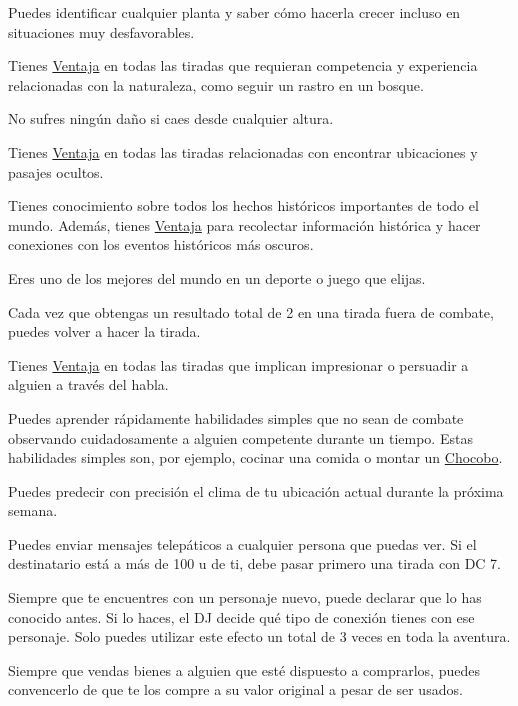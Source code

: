 \begin{description}[leftmargin=*]
{
	Puedes identificar cualquier planta y saber cómo hacerla crecer incluso en situaciones muy desfavorables.
}

{
	Tienes \hyperlink{check}{Ventaja} en todas las tiradas que requieran competencia y experiencia relacionadas con la naturaleza, como seguir un rastro en un bosque. 
}

{
	No sufres ningún daño si caes desde cualquier altura.
}

{
	Tienes \hyperlink{check}{Ventaja} en todas las tiradas relacionadas con encontrar ubicaciones y pasajes ocultos. 
}

{
	Tienes conocimiento sobre todos los hechos históricos importantes de todo el mundo. Además, tienes \hyperlink{check}{Ventaja} para recolectar información histórica y hacer conexiones con los eventos históricos más oscuros. 
}

{
	Eres uno de los mejores del mundo en un deporte o juego que elijas.
}

{
	Cada vez que obtengas un resultado total de 2 en una tirada fuera de combate, puedes volver a hacer la tirada.
}

{
	Tienes \hyperlink{check}{Ventaja} en todas las tiradas que implican impresionar o persuadir a alguien a través del habla. 
}

{
 Puedes aprender rápidamente habilidades simples que no sean de combate observando cuidadosamente a alguien competente durante un tiempo. Estas habilidades simples son, por ejemplo, cocinar una comida o montar un \hyperlink{chocobo}{Chocobo}.
}

\pagebreak

{
	Puedes predecir con precisión el clima de tu ubicación actual durante la próxima semana.
}

{
	Puedes enviar mensajes telepáticos a cualquier persona que puedas ver. Si el destinatario está a más de 100 u de ti, debe pasar primero una tirada con DC 7.
}

{
	Siempre que te encuentres con un personaje nuevo, puede declarar que lo has conocido antes. Si lo haces, el DJ decide qué tipo de conexión tienes con ese personaje. Solo puedes utilizar este efecto un total de 3 veces en toda la aventura.
}

{
	Siempre que vendas bienes a alguien que esté dispuesto a comprarlos, puedes convencerlo de que te los compre a su valor original a pesar de ser usados.
}


\end{description}
